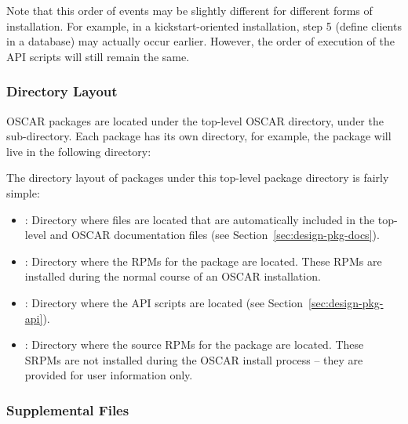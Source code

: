 Note that this order of events may be slightly different for different
forms of installation.  For example, in a kickstart-oriented
installation, step 5 (define clients in a database) may actually occur
earlier.  However, the order of execution of the API scripts will
still remain the same.

\endchange


\subsubsection{Directory Layout}

OSCAR packages are located under the top-level OSCAR directory, under
the  sub-directory.  Each package has its own
directory, for example, the  package will live in the
following directory:

\vspace{10pt}
\centerline{}
\vspace{10pt}

The directory layout of packages under this top-level package
directory is fairly simple:

\begin{itemize}
\item {}: Directory where files are located that are
  automatically included in the top-level  and
   OSCAR documentation files (see
  Section~\ref{sec:design-pkg-docs}).
  
\item {}: Directory where the RPMs for the package are
  located.  These RPMs are installed during the normal course of an
  OSCAR installation.

\item {}: Directory where the API scripts are located
  (see Section~\ref{sec:design-pkg-api}).
  
\item {}: Directory where the source RPMs for the
  package are located.  These SRPMs are not installed during the OSCAR
  install process -- they are provided for user information only.
\end{itemize}


\subsubsection{Supplemental Files}

